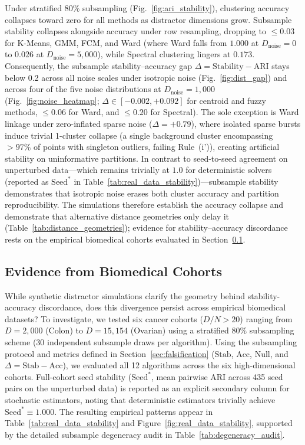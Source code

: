 \documentclass[pdflatex,sn-mathphys-num]{sn-jnl}
\theoremstyle{thmstyleone}
\theoremstyle{thmstyletwo}
\theoremstyle{thmstylethree}
\begin{document}
Under stratified 80\% subsampling (Fig.~\ref{fig:ari_stability}), clustering accuracy collapses toward zero for all methods as distractor dimensions grow. Subsample stability collapses alongside accuracy under row resampling, dropping to $\le 0.03$ for K-Means, GMM, FCM, and Ward (where Ward falls from $1.000$ at $D_{\text{noise}}=0$ to $0.026$ at $D_{\text{noise}}=5{,}000$), while Spectral clustering lingers at $0.173$. Consequently, the subsample stability--accuracy gap $\Delta = \text{Stability} - \text{ARI}$ stays below 0.2 across all noise scales under isotropic noise (Fig.~\ref{fig:dist_gap}) and across four of the five noise distributions at $D_{\text{noise}}=1{,}000$ (Fig.~\ref{fig:noise_heatmap}; $\Delta \in [-0.002, +0.092]$ for centroid and fuzzy methods, $\le 0.06$ for Ward, and $\le 0.20$ for Spectral). The sole exception is Ward linkage under zero-inflated sparse noise ($\Delta = +0.79$), where isolated sparse bursts induce trivial 1-cluster collapse (a single background cluster encompassing $> 97\%$ of points with singleton outliers, failing Rule~(i')), creating artificial stability on uninformative partitions. In contrast to seed-to-seed agreement on unperturbed data---which remains trivially at $1.0$ for deterministic solvers (reported as $\text{Seed}^*$ in Table~\ref{tab:real_data_stability})---subsample stability demonstrates that isotropic noise erases both cluster accuracy and partition reproducibility. The simulations therefore establish the accuracy collapse and demonstrate that alternative distance geometries only delay it (Table~\ref{tab:distance_geometries}); evidence for stability--accuracy discordance rests on the empirical biomedical cohorts evaluated in Section~\ref{sec:real_data_stability}.

\subsection{Evidence from Biomedical Cohorts}\label{sec:real_data_stability}

While synthetic distractor simulations clarify the geometry behind stability-accuracy discordance, does this divergence persist across empirical biomedical datasets? To investigate, we tested six cancer cohorts ($D/N > 20$) ranging from $D=2{,}000$ (Colon) to $D=15{,}154$ (Ovarian) using a stratified $80\%$ subsampling scheme (30 independent subsample draws per algorithm). Using the subsampling protocol and metrics defined in Section~\ref{sec:falsification} ($\text{Stab}$, $\text{Acc}$, $\text{Null}$, and $\Delta = \text{Stab} - \text{Acc}$), we evaluated all 12 algorithms across the six high-dimensional cohorts. Full-cohort seed stability ($\text{Seed}^*$, mean pairwise ARI across 435 seed pairs on the unperturbed data) is reported as an explicit secondary column for stochastic estimators, noting that deterministic estimators trivially achieve $\text{Seed}^* \equiv 1.000$. The resulting empirical patterns appear in Table~\ref{tab:real_data_stability} and Figure~\ref{fig:real_data_stability}, supported by the detailed subsample degeneracy audit in Table~\ref{tab:degeneracy_audit}.
\end{document}
